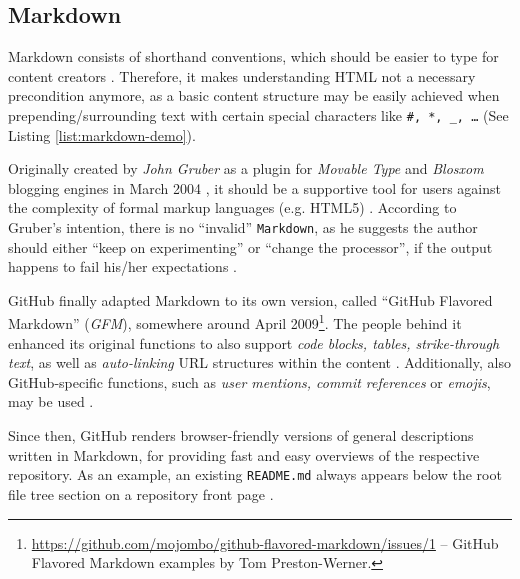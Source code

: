 \subsection{Markdown}
\label{sec:buildpipelines-markdown}



Markdown consists of shorthand conventions, which should be easier to type for content creators  \cite[38]{dhillon2016}.
Therefore, it makes understanding HTML not a necessary precondition anymore, as a basic content structure may be easily achieved when prepending/surrounding text with certain special characters like \texttt{\#, *, \_, \ldots} (See Listing \ref{list:markdown-demo}).

Originally created by \emph{John Gruber} as a plugin for \emph{Movable Type} and \emph{Blosxom} blogging engines in March 2004 \cite{Markdown2004introduction}\cite{Markdown2004main}, it should be a supportive tool for users against the complexity of formal markup languages (e.g. HTML5) \cite[4]{RFC7764}. According to Gruber's intention, there is no ``invalid'' \texttt{Markdown}, as he suggests the author should either ``keep on experimenting'' or ``change the processor'', if the output happens to fail his/her expectations \cite[5]{RFC7764}.

GitHub finally adapted Markdown to its own version, called ``GitHub Flavored Markdown'' (\emph{GFM}), somewhere around April 2009\footnote{\url{https://github.com/mojombo/github-flavored-markdown/issues/1} -- GitHub Flavored Markdown examples by Tom Preston-Werner.}. The people behind it enhanced its original functions to also support \emph{code blocks, tables, strike-through text}, as well as \emph{auto-linking} URL structures within the content \cite[18]{RFC7764}. Additionally, also GitHub-specific functions, such as \emph{user mentions, commit references} or \emph{emojis}, may be used \cite{GithubFlavoredMarkdown}.

Since then, GitHub renders browser-friendly versions of general descriptions written in Markdown, for providing fast and easy overviews of the respective repository. As an example, an existing \texttt{README.md} always appears below the root file tree section on a repository front page \cite[5]{gandrud2013github}.
